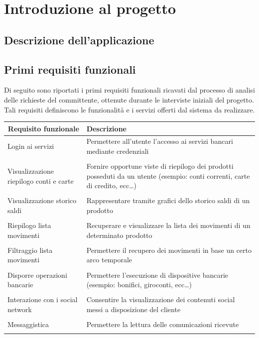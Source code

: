 \chapter{Introduzione al progetto}

\section{Descrizione dell'applicazione}



\section{Primi requisiti funzionali}
Di seguito sono riportati i primi requisiti funzionali ricavati dal processo di analisi delle richieste del committente, ottenute durante le interviste iniziali del progetto. Tali requisiti definiscono le funzionalità e i servizi 
offerti dal sistema da realizzare.

\begin{center}

    \begin{tabular}{p{6cm}|p{8cm}}

    \toprule
    \multicolumn{1}{c}{\textbf{Requisito funzionale}} &
    \textbf{Descrizione}\\

    \midrule
    Login ai servizi & Permettere all'utente l'accesso ai servizi bancari mediante credenziali \\\\
    Visualizzazione riepilogo conti e carte & Fornire opportune viste di riepilogo dei prodotti posseduti da un utente (esempio: conti correnti, carte di credito, ecc\dots)\\\\
    Visualizzazione storico saldi & Rappresentare tramite grafici dello storico saldi di un prodotto\\\\
    Riepilogo lista movimenti & Recuperare e visualizzare la lista dei movimenti di un determinato prodotto\\\\
    Filtraggio lista movimenti & Permettere il recupero dei movimenti in base un certo arco temporale\\\\
    Disporre operazioni bancarie & Permettere l'esecuzione di dispositive bancarie (esempio: bonifici, giroconti, ecc\dots) \\\\
    Interazione con i social network & Consentire la visualizzazione dei contenuti social messi a disposizione del cliente\\\\
    Messaggistica & Permettere la lettura delle comunicazioni ricevute  \\\\
    \bottomrule

    \end{tabular}
        \label{tab:requisiti_iniziali}

\end{center}




